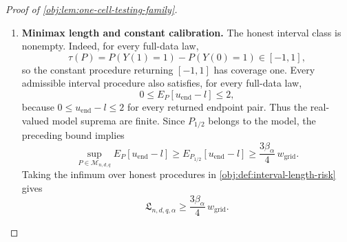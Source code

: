 \documentclass[11pt]{article}
\begin{document}
\begin{proof}[Proof of \cref{obj:lem:one-cell-testing-family}]
\begin{enumerate}
Summing coverage probabilities under the reference output law gives
\[
\int C_{\mathrm{grid}}(l,u_{\mathrm{end}})\,
     \mu_{\mathrm{ref}}(d(l,u_{\mathrm{end}}))
=
\sum_{j=0}^{M}\mu_{\mathrm{ref}}(B_j)
\ge(M+1)(\beta_\alpha-\varepsilon_\alpha).
\]
Integrating the pointwise length bound therefore yields
\[
\int(u_{\mathrm{end}}-l)\,\mu_{\mathrm{ref}}(d(l,u_{\mathrm{end}}))
\ge
\Delta_{\mathrm{grid}}
\left((M+1)\frac{7\beta_\alpha}{8}-1\right).
\]
The choice of \(M\) gives \(M\beta_\alpha\ge8\), and
\[
(M+1)\frac{7\beta_\alpha}{8}-1
-\frac{3\beta_\alpha M}{4}
=
\frac{M\beta_\alpha}{8}
+\frac{7\beta_\alpha}{8}-1
\ge0.
\]
Since \(M\Delta_{\mathrm{grid}}=w_{\mathrm{grid}}\), we conclude
\[
\int(u_{\mathrm{end}}-l)\,\mu_{\mathrm{ref}}(d(l,u_{\mathrm{end}}))
\ge\frac{3\beta_\alpha}{4}\,w_{\mathrm{grid}}.
\]
The endpoint length is measurable and bounded by two. Integrating first over the sample and then over the kernel therefore equals integration under its output law, giving
\[
E_{P_{1/2}}[u_{\mathrm{end}}-l]
=
\int(u_{\mathrm{end}}-l)\,\mu_{\mathrm{ref}}(d(l,u_{\mathrm{end}}))
\ge\frac{3\beta_\alpha}{4}\,w_{\mathrm{grid}}.
\]
All randomization is included in this expectation.

\item \textbf{Minimax length and constant calibration.}
The honest interval class is nonempty. Indeed, for every full-data law,
\[
\tau(P)=P(Y(1)=1)-P(Y(0)=1)\in[-1,1],
\]
so the constant procedure returning \([-1,1]\) has coverage one. Every admissible interval procedure also satisfies, for every full-data law,
\[
0\le E_P[u_{\mathrm{end}}-l]\le2,
\]
because \(0\le u_{\mathrm{end}}-l\le2\) for every returned endpoint pair. Thus the real-valued model suprema are finite. Since \(P_{1/2}\) belongs to the model, the preceding bound implies
\[
\sup_{P\in\mathcal M_{n,d,q}}E_P[u_{\mathrm{end}}-l]
\ge E_{P_{1/2}}[u_{\mathrm{end}}-l]
\ge\frac{3\beta_\alpha}{4}\,w_{\mathrm{grid}}.
\]
Taking the infimum over honest procedures in
\cref{obj:def:interval-length-risk} gives
\[
\mathfrak L_{n,d,q,\alpha}
\ge\frac{3\beta_\alpha}{4}\,w_{\mathrm{grid}}.
\]


\end{enumerate}
\end{proof}
\end{document}
